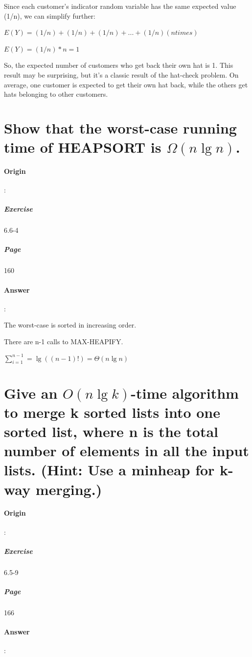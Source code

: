 \documentclass{article}
\begin{document}
  Since each customer's indicator random variable has the same expected value (1/n), we can simplify further:
  
  $E(Y) = (1/n) + (1/n) + (1/n) + ... + (1/n) (n times)$
  
  $E(Y) = (1/n) * n = 1$
  
  So, the expected number of customers who get back their own hat is 1. This result may be surprising, but it's a classic result of the hat-check problem. On average, one customer is expected to get their own hat back, while the others get hats belonging to other customers.
  \section{Show that the worst-case running time of HEAPSORT is $ \Omega (n \lg n)$.}
  \paragraph{Origin}:
    \subparagraph{Exercise}6.6-4
    \subparagraph{Page}160
  \paragraph{Answer}:

  The worst-case is sorted in increasing order.

  There are n-1 calls to MAX-HEAPIFY.

  $\sum_{i=1}^{n-1} = \lg((n-1)!) = \Theta(n \lg n)$

  \section{Give an $O (n \lg k)$-time algorithm to merge k sorted lists into one sorted list, where n is the total number of elements in all the input lists. (Hint: Use a minheap for k-way merging.)}
  \paragraph{Origin}:
    \subparagraph{Exercise}6.5-9
    \subparagraph{Page}166
  \paragraph{Answer}:
  
\end{document}
